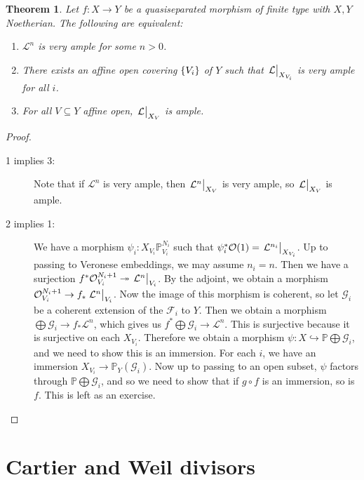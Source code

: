 \documentclass[leqno, openany]{memoir}
\newtheorem{thm}{Theorem}[section]
\theoremstyle{definition}
\theoremstyle{remark}
\theoremstyle{plain}
\theoremstyle{definition}
\theoremstyle{remark}
\renewcommand{\P}{\mathbb{P}}
\newcommand{\mc}[1]{\mathcal{#1}}
\begin{document}
\begin{thm} Let $f \colon X \to Y$ be a quasiseparated morphism of finite type
    with $X, Y$ Noetherian. The following are equivalent: \begin{enumerate}
        \item $\mc{L}^n$ is very ample for some $n > 0$.  \item There exists an
            affine open covering $\qty{V_i}$ of $Y$ such that
            $\eval{\mc{L}}_{X_{V_i}}$ is very ample for all $i$.  \item For all
    $V \subseteq Y$ affine open, $\eval{\mc{L}}_{X_V}$ is ample.
    \end{enumerate} \end{thm}

\begin{proof}\leavevmode \begin{description} \item[1 implies 3:] Note that if
    $\mc{L}^n$ is very ample, then $\eval{\mc{L}^n}_{X_V}$ is very ample, so
    $\eval{\mc{L}}_{X_V}$ is ample.  \item[2 implies 1:] We have a morphism
    $\psi_i \colon X_{V_i} \P^{N_i}_{V_i}$ such that $\psi_i^* \mc{O}(1) =
    \eval{\mc{L}^{n_i}}_{X_{V_i}}$. Up to passing to Veronese embeddings, we
    may assume $n_i = n$. Then we have a surjection $f^* \mc{O}_{V_i}^{N_i+1}
    \twoheadrightarrow \eval{\mc{L}^n}_{V_i}$. By the adjoint, we obtain a
    morphism $\mc{O}_{V_i}^{N_i+1} \to f_* \eval{\mc{L}^n}_{V_i}$. Now the
    image of this morphism is coherent, so let $\mc{G}_i$ be a coherent
    extension of the $\mc{F}_i$ to $Y$. Then we obtain a morphism $\bigoplus
    \mc{G}_i \to f_* \mc{L}^n$, which gives us $f^* \bigoplus \mc{G}_i \to
    \mc{L}^n$. This is surjective because it is surjective on each $X_{V_i}$.
    Therefore we obtain a morphism $\psi \colon X \hookrightarrow \P \bigoplus
    \mc{G}_i$, and we need to show this is an immersion. For each $i$, we have
    an immersion $X_{V_i} \to \P_{Y}(\mc{G}_i)$. Now up to passing to an open
    subset, $\psi$ factors through $\P \bigoplus \mc{G}_i$, and so we need to
    show that if $g \circ f$ is an immersion, so is $f$. This is left as an
    exercise. \qedhere \end{description} \end{proof}

\section{Cartier and Weil divisors}%
\end{document}
